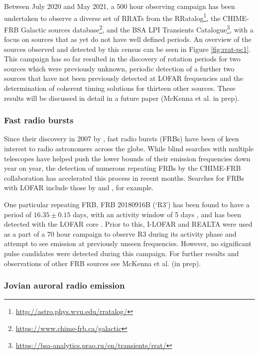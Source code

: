 Between July 2020 and May 2021, a 500 hour observing campaign has been undertaken to observe a diverse set of RRATs from the RRatalog\footnote{\hyperref[RRatalog]{http://astro.phys.wvu.edu/rratalog/}}, the CHIME-FRB Galactic sources database\footnote{\hyperref[CHIME-FRB Galactic Sources]{https://www.chime-frb.ca/galactic}}, and the BSA LPI Transients Catalogue\footnote{\hyperref[BSA LPI Transients Catalogue]{https://bsa-analytics.prao.ru/en/transients/rrat/}}, with a focus on sources that as yet do not have well defined periods. An overview of the sources observed and detected by this census can be seen in Figure \ref{fig:rrat-pc1}. This campaign has so far resulted in the discovery of rotation periods for two sources which were previously unknown, periodic detection of a further two sources that have not been previously detected at LOFAR frequencies and the determination of coherent timing solutions for thirteen other sources. These results will be discussed in detail in a future paper (McKenna et al. in prep).%


\subsubsection{Fast radio bursts}
Since their discovery in 2007 by \citeauthor{Lorimer2007}, fast radio bursts (FRBs) have been of keen interest to radio astronomers across the globe. While blind searches with multiple telescopes have helped push the lower bounds of their emission frequencies down year on year, the detection of numerous repeating FRBs by the CHIME-FRB collaboration \citep{CHIME2019} has accelerated this process in recent months. Searches for FRBs with LOFAR include those by \cite{Karastergiou2015} and \cite{TerVeen2019}, for example.

One particular repeating FRB, FRB 20180916B (`R3') has been found to have a period of $16.35\pm 0.15$ days, with an activity window of 5 days \citep{Amiri2020}, and has been detected with the LOFAR core \citep{Pastor-Marazuela2020, Pleunis2021}. Prior to this, I-LOFAR and REALTA were used as a part of a 70 hour campaign to observe R3 during its activity phase and attempt to see emission at previously unseen frequencies. However, no significant pulse candidates were detected during this campaign. For further results and observations of other FRB sources see McKenna et al. (in prep).



\subsubsection{Jovian auroral radio emission}

